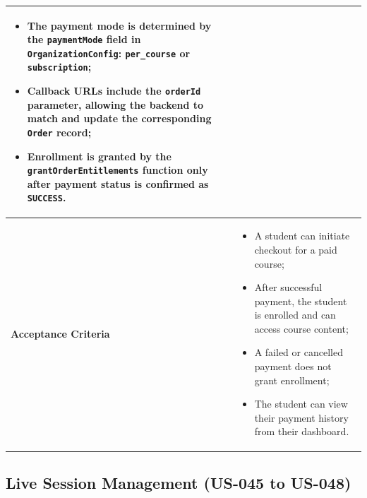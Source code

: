\begin{table}[H]
\begin{tabularx}{\textwidth}{|p{3.5cm}|X|}
\begin{itemize}[noitemsep, topsep=2pt]
  \item The payment mode is determined by the \texttt{paymentMode} field in
        \texttt{OrganizationConfig}: \texttt{per\_course} or \texttt{subscription};
  \item Callback URLs include the \texttt{orderId} parameter, allowing the backend to
        match and update the corresponding \texttt{Order} record;
  \item Enrollment is granted by the \texttt{grantOrderEntitlements} function only after
        payment status is confirmed as \texttt{SUCCESS}.
\end{itemize} \\
\hline
\textbf{Acceptance Criteria} &
\begin{itemize}[noitemsep, topsep=2pt]
  \item A student can initiate checkout for a paid course;
  \item After successful payment, the student is enrolled and can access course content;
  \item A failed or cancelled payment does not grant enrollment;
  \item The student can view their payment history from their dashboard.
\end{itemize} \\
\hline
\end{tabularx}
\end{table}

\subsection{Live Session Management (US-045 to US-048)}

